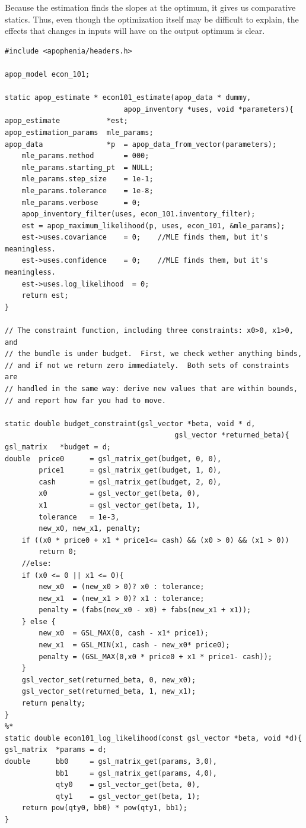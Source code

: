 Because the estimation finds the slopes at the optimum, it gives us
comparative statics. Thus, even though the optimization itself may be
difficult to explain, the effects that changes in inputs will have on
the output optimum is clear.

\begin{lstlisting}
#include <apophenia/headers.h>

apop_model econ_101;

static apop_estimate * econ101_estimate(apop_data * dummy, 
                            apop_inventory *uses, void *parameters){
apop_estimate           *est;
apop_estimation_params  mle_params;
apop_data               *p  = apop_data_from_vector(parameters);
    mle_params.method       = 000;
    mle_params.starting_pt  = NULL;
    mle_params.step_size    = 1e-1;
    mle_params.tolerance    = 1e-8;
    mle_params.verbose      = 0;
    apop_inventory_filter(uses, econ_101.inventory_filter);
    est = apop_maximum_likelihood(p, uses, econ_101, &mle_params);
    est->uses.covariance    = 0;    //MLE finds them, but it's meaningless.
    est->uses.confidence    = 0;    //MLE finds them, but it's meaningless.
    est->uses.log_likelihood  = 0;
    return est;
}

// The constraint function, including three constraints: x0>0, x1>0, and
// the bundle is under budget.  First, we check wether anything binds,
// and if not we return zero immediately.  Both sets of constraints are
// handled in the same way: derive new values that are within bounds,
// and report how far you had to move.

static double budget_constraint(gsl_vector *beta, void * d, 
                                        gsl_vector *returned_beta){
gsl_matrix   *budget = d;
double  price0      = gsl_matrix_get(budget, 0, 0),
        price1      = gsl_matrix_get(budget, 1, 0),
        cash        = gsl_matrix_get(budget, 2, 0),
        x0          = gsl_vector_get(beta, 0),
        x1          = gsl_vector_get(beta, 1),
        tolerance   = 1e-3,
        new_x0, new_x1, penalty;
    if ((x0 * price0 + x1 * price1<= cash) && (x0 > 0) && (x1 > 0))
        return 0;
    //else:
    if (x0 <= 0 || x1 <= 0){
        new_x0  = (new_x0 > 0)? x0 : tolerance;
        new_x1  = (new_x1 > 0)? x1 : tolerance;
        penalty = (fabs(new_x0 - x0) + fabs(new_x1 + x1));
    } else {
        new_x0  = GSL_MAX(0, cash - x1* price1);
        new_x1  = GSL_MIN(x1, cash - new_x0* price0);
        penalty = (GSL_MAX(0,x0 * price0 + x1 * price1- cash));
    }
    gsl_vector_set(returned_beta, 0, new_x0);
    gsl_vector_set(returned_beta, 1, new_x1);
    return penalty;
}
%*
static double econ101_log_likelihood(const gsl_vector *beta, void *d){
gsl_matrix  *params = d;
double      bb0     = gsl_matrix_get(params, 3,0),
            bb1     = gsl_matrix_get(params, 4,0),
            qty0    = gsl_vector_get(beta, 0),
            qty1    = gsl_vector_get(beta, 1);
    return pow(qty0, bb0) * pow(qty1, bb1);
}    


\end{lstlisting}
